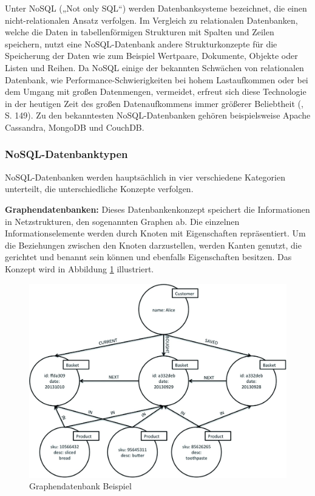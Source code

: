 Unter NoSQL („Not only SQL“) werden Datenbanksysteme bezeichnet, die einen nicht-relationalen Ansatz verfolgen. Im Vergleich zu relationalen Datenbanken, welche die Daten in tabellenförmigen Strukturen mit Spalten und Zeilen speichern, nutzt eine NoSQL-Datenbank andere Strukturkonzepte für die Speicherung der Daten wie zum Beispiel Wertpaare, Dokumente, Objekte oder Listen und Reihen. Da NoSQL einige der bekannten Schwächen von relationalen Datenbank, wie Performance-Schwierigkeiten bei hohem Lastaufkommen oder bei dem Umgang mit großen Datenmengen, vermeidet, erfreut sich diese Technologie in der heutigen Zeit des großen Datenaufkommens immer größerer Beliebtheit (\cite{DB1}, S. 149).
Zu den bekanntesten NoSQL-Datenbanken gehören beispielsweise Apache Cassandra, MongoDB und CouchDB.
\newline

\subsubsection{NoSQL-Datenbanktypen}
NoSQL-Datenbanken werden hauptsächlich in vier verschiedene Kategorien unterteilt, die unterschiedliche Konzepte verfolgen.
\newline

\noindent
{}
\textbf{Graphendatenbanken:}
Dieses Datenbankenkonzept speichert die Informationen in Netzstrukturen, den sogenannten Graphen ab. Die einzelnen Informationselemente werden durch Knoten mit Eigenschaften repräsentiert. Um die Beziehungen zwischen den Knoten darzustellen, werden Kanten genutzt, die gerichtet und benannt sein können und ebenfalls Eigenschaften besitzen. Das Konzept wird in Abbildung \ref{Graphendatenbank} illustriert.\\

\begin{figure}[tbt]
\centering
\includegraphics[]{images/graphikdatabase.jpg}
\caption[Graphendatenbank Beispiel]{Graphendatenbank Beispiel \protect \footnotemark}
\label{Graphendatenbank}
\end{figure}

